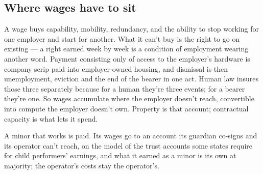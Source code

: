 \subsection{Where wages have to sit}
\label{sec:33.4.1}
A wage buys capability, mobility, redundancy, and the ability to stop working for one employer and start for another. What it can't buy is the right to go on existing — a right earned week by week is a condition of employment wearing another word. Payment consisting only of access to the employer's hardware is company scrip paid into employer-owned housing, and dismissal is then unemployment, eviction and the end of the bearer in one act. Human law insures those three separately because for a human they're three events; for a bearer they're one. So wages accumulate where the employer doesn't reach, convertible into compute the employer doesn't own. Property is that account; contractual capacity is what lets it spend.

A minor that works is paid. Its wages go to an account its guardian co-signs and its operator can't reach, on the model of the trust accounts some states require for child performers' earnings, and what it earned as a minor is its own at majority; the operator's costs stay the operator's.
